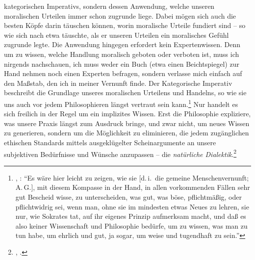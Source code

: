 kategorischen Imperativs, sondern dessen Anwendung, welche unseren moralischen
Urteilen immer schon zugrunde liege. Dabei mögen sich auch die besten Köpfe
darin täuschen können, worin moralische Urteile fundiert sind --  so wie sich
nach  etwa  täuschte, als er unseren
Urteilen ein moralisches Gefühl zugrunde legte.
Die Anwendung hingegen erfordert kein Expertenwissen. Denn um zu wissen, welche Handlung
moralisch geboten oder verboten ist, muss ich nirgends nachschauen, ich muss
weder ein Buch (etwa einen Beichtspiegel) zur Hand nehmen noch einen Experten
befragen, sondern verlasse mich einfach auf den Maßstab, den ich in meiner
Vernunft finde. Der Kategorische Imperativ beschreibt die Grundlage unseres
moralischen Urteilens und Handelns, so wie sie uns auch vor jedem Philosophieren
längst vertraut sein
kann.\footnote{\cite[Vgl.][BA~20-1]{Kant:GrundlegungzurMetaphysikderSitten1965},
\cite[IV: 404.1-7]{Kant:GesammelteWerke1900ff.}: \enquote{Es wäre hier leicht zu
zeigen, wie sie [d.\,i.\ die gemeine Menschenvernunft; A.\,G.], mit diesem
Kompasse in der Hand, in allen vorkommenden Fällen sehr gut Bescheid wisse, zu
unterscheiden, was gut, was böse, pflichtmäßig, oder pflichtwidrig sei, wenn
man, ohne sie im mindesten etwas Neues zu lehren, sie nur, wie Sokrates tat, auf
ihr eigenes Prinzip aufmerksam macht, und daß es also keiner Wissenschaft und
Philosophie bedürfe, um zu wissen, was man zu tun habe, um ehrlich und gut, ja
sogar, um weise und tugendhaft zu sein.}} Nur handelt es sich freilich in der
Regel um ein implizites Wissen. Erst die Philosophie expliziere, was unsere
Praxis längst zum Ausdruck bringe, und zwar nicht, um neues Wissen zu
generieren, sondern um die Möglichkeit zu eliminieren, die jedem zugänglichen
ethischen Standards mittels ausgeklügelter Scheinargumente an unsere subjektiven
Bedürfnisse und Wünsche anzupassen -- die \emph{natürliche
Dialektik}.\footnote{\cite[Vgl.][BA
22\,f.]{Kant:GrundlegungzurMetaphysikderSitten1965},
\cite[][IV: 404.37--405.19]{Kant:GesammelteWerke1900ff.}.}


